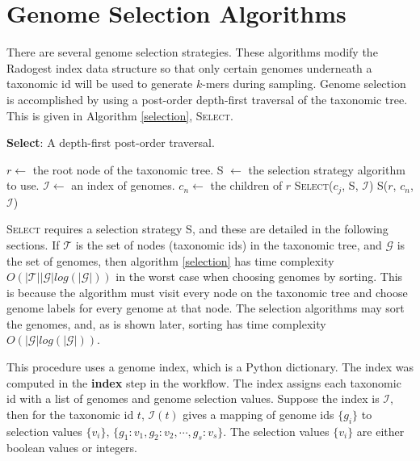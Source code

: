 \documentclass[12pt, letterpaper]{article}
\begin{document}
\section{Genome Selection Algorithms}

There are several genome selection strategies.  These algorithms modify the Radogest index data structure so that only certain genomes underneath a taxonomic id will be used to generate $k$-mers during sampling.  Genome selection is accomplished by using a post-order depth-first traversal of the taxonomic tree.  This is given in Algorithm \ref{selection}, \textsc{Select}.

\begin{algorithm}
\caption{\textbf{Select}: A depth-first post-order traversal.}
\label{selection}
\begin{algorithmic}
\State $r \gets$ the root node of the taxonomic tree.
\State \textsc{S} $\gets$ the selection strategy algorithm to use. 
\State $\mathcal{I} \gets$ an index of genomes. 
\State $c_n \gets$ the children of $r$
    \textsc{Select}($c_j$, S, $\mathcal{I}$)
\EndFor
\textsc{S}($r$, $c_n$, $\mathcal{I}$)
\EndProcedure
\end{algorithmic}
\end{algorithm}

\textsc{Select} requires a selection strategy S, and these are detailed in the following sections.  If $\mathcal{T}$ is the set of nodes (taxonomic ids) in the taxonomic tree, and $\mathcal{G}$ is the set of genomes, then algorithm \ref{selection} has time complexity $O(|\mathcal{T}||\mathcal{G}|log(|\mathcal{G}|))$ in the worst case when choosing genomes by sorting.  This is because the algorithm must visit every node on the taxonomic tree and choose genome labels for every genome at that node.  The selection algorithms may sort the genomes, and, as is shown later, sorting has time complexity $O(\mathcal{|G|}log(\mathcal{|G|}))$.

This procedure uses a genome index, which is a Python dictionary.  The index was computed in the \textbf{index} step in the workflow.  The index assigns each taxonomic id with a list of genomes and genome selection values.  Suppose the index is $\mathcal{I}$, then for the taxonomic id $t$, $\mathcal{I}(t)$ gives a mapping of genome ids $\{g_i\}$ to selection values $\{v_i\}$, $\{g_1: v_1, g_2: v_2, \cdots, g_s : v_s \}$.  The selection values $\{v_i\}$ are either boolean values or integers. 
\end{document}
